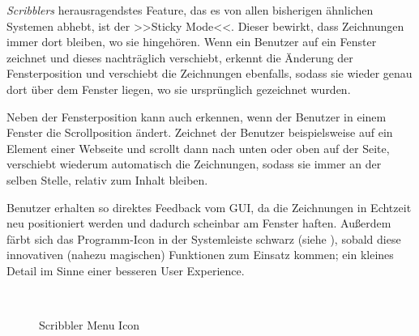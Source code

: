 \medskip \emph{Scribblers} herausragendstes Feature, das es von allen bisherigen ähnlichen Systemen abhebt, ist der >>Sticky Mode<<. Dieser bewirkt, dass Zeichnungen immer dort bleiben, wo sie hingehören. Wenn ein Benutzer auf ein Fenster zeichnet und dieses nachträglich verschiebt, erkennt \scribbler die Änderung der Fensterposition und verschiebt die Zeichnungen ebenfalls, sodass sie wieder genau dort über dem Fenster liegen, wo sie ursprünglich gezeichnet wurden.

Neben der Fensterposition kann \scribbler auch erkennen, wenn der Benutzer in einem Fenster die Scrollposition ändert. Zeichnet der Benutzer beispielsweise auf ein Element einer Webseite und scrollt dann nach unten oder oben auf der Seite, verschiebt \scribbler wiederum automatisch die Zeichnungen, sodass sie immer an der selben Stelle, relativ zum Inhalt bleiben.

Benutzer erhalten so direktes Feedback vom GUI, da die Zeichnungen in Echtzeit neu positioniert werden und dadurch scheinbar am Fenster haften. Außerdem färbt sich das Programm-Icon in der Systemleiste schwarz (siehe ), sobald diese innovativen (nahezu magischen) Funktionen zum Einsatz kommen; ein kleines Detail im Sinne einer besseren User Experience. 

\begin{figure}
	\begin{center}
        \myfloatalign
         \quad
         \quad
		 \\
        \caption[Scribbler Menu Icon]{Scribbler Menu Icon}\label{fig:scribblerMenuIcon}
	\end{center}
\end{figure}

